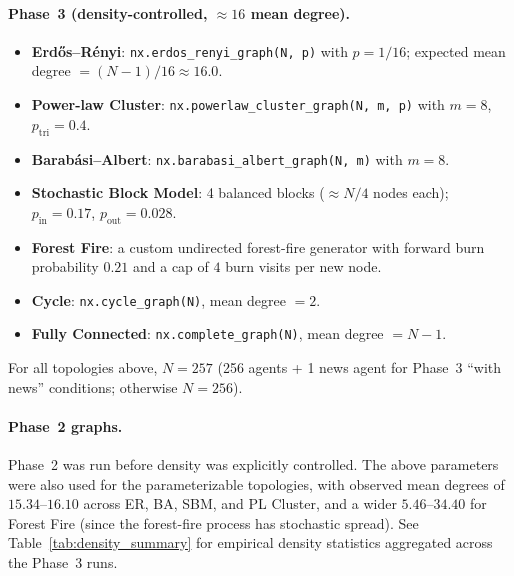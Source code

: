 \documentclass[11pt]{article}
\begin{document}
\paragraph{Phase~3 (density-controlled, $\approx 16$ mean degree).}
\begin{itemize}[leftmargin=*]
    \item \textbf{Erd\H{o}s--R\'enyi}: \texttt{nx.erdos\_renyi\_graph(N, p)} with $p = 1/16$; expected mean degree $= (N-1)/16 \approx 16.0$.
    \item \textbf{Power-law Cluster}: \texttt{nx.powerlaw\_cluster\_graph(N, m, p)} with $m = 8$, $p_{\text{tri}} = 0.4$.
    \item \textbf{Barab\'{a}si--Albert}: \texttt{nx.barabasi\_albert\_graph(N, m)} with $m = 8$.
    \item \textbf{Stochastic Block Model}: 4 balanced blocks ($\approx N/4$ nodes each); $p_{\text{in}} = 0.17$, $p_{\text{out}} = 0.028$.
    \item \textbf{Forest Fire}: a custom undirected forest-fire generator with forward burn probability $0.21$ and a cap of $4$ burn visits per new node.
    \item \textbf{Cycle}: \texttt{nx.cycle\_graph(N)}, mean degree $= 2$.
    \item \textbf{Fully Connected}: \texttt{nx.complete\_graph(N)}, mean degree $= N-1$.
\end{itemize}

For all topologies above, $N = 257$ (256 agents + 1 news agent for Phase~3 ``with news'' conditions; otherwise $N = 256$).

\paragraph{Phase~2 graphs.} Phase~2 was run before density was explicitly controlled. The above parameters were also used for the parameterizable topologies, with observed mean degrees of $15.34$--$16.10$ across ER, BA, SBM, and PL Cluster, and a wider $5.46$--$34.40$ for Forest Fire (since the forest-fire process has stochastic spread). See Table~\ref{tab:density_summary} for empirical density statistics aggregated across the Phase~3 runs.
\end{document}
